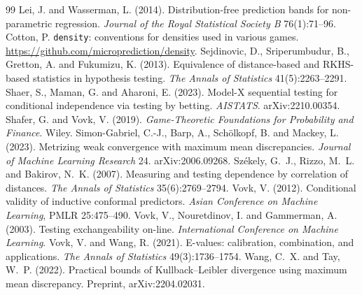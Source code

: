 \documentclass[11pt]{article}
\begin{document}
\begin{thebibliography}{99}
 Lei, J. and Wasserman, L. (2014).
Distribution-free prediction bands for non-parametric regression. \emph{Journal of the Royal
Statistical Society B} 76(1):71--96.
 Cotton, P. \texttt{density}: conventions for
densities used in various games. \url{https://github.com/microprediction/density}.
 Sejdinovic, D., Sriperumbudur, B., Gretton, A. and
Fukumizu, K. (2013). Equivalence of distance-based and RKHS-based statistics in hypothesis testing.
\emph{The Annals of Statistics} 41(5):2263--2291.
 Shaer, S., Maman, G. and Aharoni, E. (2023). Model-X
sequential testing for conditional independence via testing by betting. \emph{AISTATS}.
arXiv:2210.00354.
 Shafer, G. and Vovk, V. (2019). \emph{Game-Theoretic
Foundations for Probability and Finance}. Wiley.
 Simon-Gabriel, C.-J., Barp, A., Sch\"olkopf,
B. and Mackey, L. (2023). Metrizing weak convergence with maximum mean discrepancies. \emph{Journal
of Machine Learning Research} 24. arXiv:2006.09268.
 Sz\'ekely, G.~J., Rizzo, M.~L. and Bakirov, N.~K.
(2007). Measuring and testing dependence by correlation of distances. \emph{The Annals of
Statistics} 35(6):2769--2794.
 Vovk, V. (2012). Conditional validity of inductive conformal
predictors. \emph{Asian Conference on Machine Learning}, PMLR 25:475--490.
 Vovk, V., Nouretdinov, I. and Gammerman, A. (2003). Testing
exchangeability on-line. \emph{International Conference on Machine Learning}.
 Vovk, V. and Wang, R. (2021). E-values: calibration,
combination, and applications. \emph{The Annals of Statistics} 49(3):1736--1754.
 Wang, C.~X. and Tay, W.~P. (2022). Practical bounds of
Kullback--Leibler divergence using maximum mean discrepancy. Preprint, arXiv:2204.02031.
\end{thebibliography}
\end{document}
